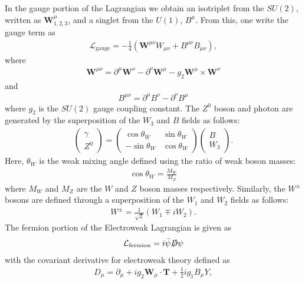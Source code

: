 \documentclass[12pt, oneside]{article}   	%
\begin{document}
\noindent In the gauge portion of the Lagrangian we obtain an isotriplet from the $SU(2)$, written as $\textbf{W}^{\mu}_{1,2,3}$, and a singlet from the $U(1)$, $B^{\mu}$.
From this, one write the gauge term as
\begin{align}
\mathcal{L}_{\textrm{gauge}} = -\frac{1}{4}\left(\textbf{W}^{\mu \nu}W_{\mu \nu} + B^{\mu \nu}B_{\mu \nu} \right),
\end{align}
where
\begin{align}
\textbf{W}^{\mu \nu} = \partial^{\mu} \textbf{W}^{\nu} - \partial^{\nu} \textbf{W}^{\mu} - g_{2} \textbf{W}^{\mu} \times \textbf{W}^{\nu}
\end{align}
and
\begin{align}
B^{\mu \nu} = \partial^{\mu} B^{\nu} - \partial^{\nu} B^{\mu}
\end{align}
where $g_{2}$ is the $SU(2)$ gauge coupling constant.
The $Z^{0}$ boson and photon are generated by the superposition of the $W_{3}$ and $B$ fields as follows:
\begin{align}
\begin{pmatrix}
\gamma \\
Z^{0}
\end{pmatrix} = \begin{pmatrix} 
\cos\theta_{W} & \sin\theta_{W} \\
-\sin\theta_{W}& \cos\theta_{W} 
\end{pmatrix} \begin{pmatrix}
B \\
W_{3}
 \end{pmatrix}.
\end{align}
Here, $\theta_{W}$ is the weak mixing angle defined using the ratio of weak boson masses:
\begin{align} 
\cos\theta_{W} = \frac{M_{W}}{M_{Z}}
\end{align}
where $M_{W}$ and $M_{Z}$ are the $W$ and $Z$ boson masses respectively.
Similarly, the $W^{\pm}$ bosons are defined through a superposition of the $W_{1}$ and $W_{2}$ fields as follows:
\begin{align}
W^{\pm} = \frac{1}{\sqrt{2}} \left(W_{1} \mp iW_{2} \right).
\end{align}
The fermion portion of the Electroweak Lagrangian is given as
\begin{align}
\mathcal{L}_{\textrm{fermion}} = i \bar{\psi}\slashed{D}\psi
\end{align}
with the covariant derivative for electroweak theory defined as 
\begin{align}
D_{\mu} =  \partial_{\mu} + ig_{2}\textbf{W}_{\mu} \cdot \textbf{T} + \frac{1}{2} ig_{1} B_{\mu} Y,
\label{eqn:EWDerivative}
\end{align}
\end{document}
